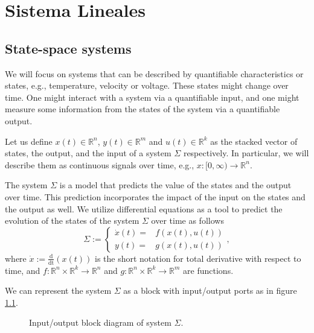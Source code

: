 \chapter{Sistema Lineales}

\section{State-space systems}
We will focus on systems that can be described by quantifiable characteristics or states, e.g., temperature, velocity or voltage. These states might change over time. One might interact with a system via a quantifiable input, and one might measure some information from the states of the system via a quantifiable output.

Let us define $x(t)\in\mathbb{R}^n$, $y(t)\in\mathbb{R}^m$ and $u(t)\in\mathbb{R}^k$ as the stacked vector of states, the output, and the input of a system $\Sigma$ respectively. In particular, we will describe them as continuous signals over time, e.g., $x :[0,\infty) \to \mathbb{R}^n$. 

The system $\Sigma$ is a model that predicts the value of the states and the output over time. This prediction incorporates the impact of the input on the states and the output as well. We utilize differential equations as a tool to predict the evolution of the states of the system $\Sigma$ over time as follows
\begin{equation}
	\Sigma := \begin{cases}
		\dot x(t) =& f(x(t),u(t)) \\ y(t) =& g(x(t),u(t))
	\end{cases}, \nonumber
\end{equation}
where $\dot x := \frac{\mathrm{d}}{\mathrm{dt}}(x(t))$ is the short notation for total derivative with respect to time, and $f: \mathbb{R}^n \times \mathbb{R}^k \to \mathbb{R}^n$ and $g: \mathbb{R}^n \times \mathbb{R}^k \to \mathbb{R}^m$ are functions.

We can represent the system $\Sigma$ as a block with input/output ports as in figure \ref{fig: sigma}.

\begin{figure}[!h]
\centering
{}
	\caption{Input/output block diagram of system $\Sigma$.}
	\label{fig: sigma}
\end{figure}

